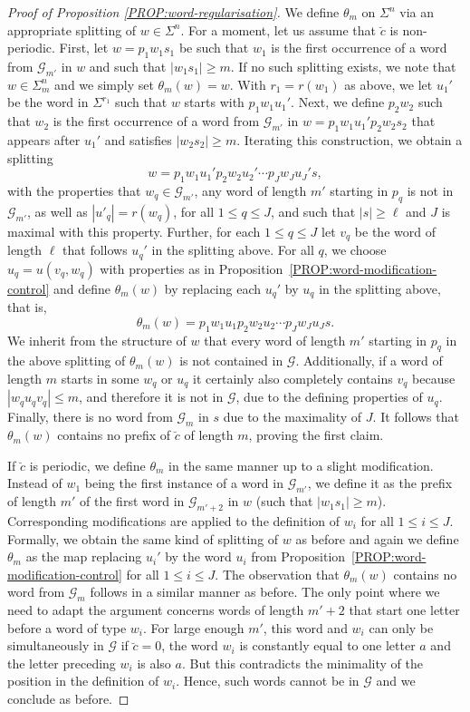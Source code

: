 \documentclass[11pt,reqno]{amsart}
\theoremstyle{plain}
\theoremstyle{definition}
\newcommand{\mc}{\mathcal}
\begin{document}
\begin{proof}[Proof of Proposition \ref{PROP:word-regularisation}]
We define $\theta_m$ on $\Sigma^n$ via an appropriate splitting of $w \in \Sigma^n$. 
For a moment, let us assume that $\breve{c}$ is non-periodic.
First, let $w = p_1 w_1 s_1$ be such that $w_1$ is the first occurrence of a word from $\mc G_{m'}$ in $w$ and such that $|w_1 s_1| \geqslant m$. If no such splitting exists, we note that $w \in \Sigma^n_m$ and we simply set $\theta_m(w) = w$. With $r_1 = r(w_1)$ as above, we let $u_1'$ be the word in $\Sigma^{r_1}$ such that $w$ starts with $p_1 w_1 u_1'$. Next, we define $p_2 w_2$ such that $w_2$ is the first occurrence of a word from $\mc G_{m'}$ in $w = p_1 w_1 u_1' p_2 w_2 s_2$ that appears after $u_1'$ and satisfies $|w_2 s_2| \geqslant m$. Iterating this construction, we obtain a splitting
\[
w = p_1 w_1 u_1' p_2 w_2 u_2' \cdots p_J w_J u_J' s,
\]
with the properties that $w_q \in \mc G_{m'}$, any word of length $m'$ starting in $p_q$ is not in $\mc G_{m'}$, as well as $|u'_q| = r(w_q)$, for all $1 \leqslant q \leqslant J$, and such that $|s| \geqslant \ell$ and $J$ is maximal with this property. Further, for each $1\leqslant q \leqslant J$ let $v_q$ be the word of length $\ell$ that follows $u_q'$ in the splitting above. 
For all $q$, we choose $u_q = u(v_q,w_q)$ with properties as in Proposition~\ref{PROP:word-modification-control} and define $\theta_m(w)$ by replacing each $u_q'$ by $u_q$ in the splitting above, that is,
\[
\theta_m(w) = p_1 w_1 u_1 p_2 w_2 u_2 \cdots p_J w_J u_J s.
\]
We inherit from the structure of $w$ that every word of length $m'$ starting in $p_q$ in the above splitting of $\theta_m(w)$ is not contained in $\mc G$. Additionally, if a word of length $m$ starts in some $w_q$ or $u_q$ it certainly also completely contains $v_q$ because $|w_q u_q v_q| \leqslant m$, and therefore it is not in $\mc G$, due to the defining properties of $u_q$. Finally, there is no word from $\mc G_m$ in $s$ due to the maximality of $J$. It follows that $\theta_m(w)$ contains no prefix of $\breve{c}$ of length $m$, proving the first claim.

If $\breve{c}$ is periodic, we define $\theta_m$ in the same manner up to a slight modification. Instead of $w_1$ being the first instance of a word in $\mc G_{m'}$, we define it as the prefix of length $m'$ of the first word in $\mc G_{m'+2}$ in $w$ (such that $|w_1 s_1| \geqslant m$). Corresponding modifications are applied to the definition of $w_i$ for all $1\leqslant i \leqslant J$. Formally, we obtain the same kind of splitting of $w$ as before and again we define $\theta_m$ as the map replacing $u_i'$ by the word $u_i$ from Proposition~\ref{PROP:word-modification-control} for all $1\leqslant i \leqslant J$. The observation that $\theta_m(w)$ contains no word from $\mc G_m$ follows in a similar manner as before. The only point where we need to adapt the argument concerns words of length $m'+2$ that start one letter before a word of type $w_i$. For large enough $m'$, this word and $w_i$ can only be simultaneously in $\mc G$ if $\breve{c} = 0$, the word $w_i$ is constantly equal to one letter $a$ and the letter preceding $w_i$ is also $a$. But this contradicts the minimality of the position in the definition of $w_i$. Hence, such words cannot be in $\mc G$ and we conclude as before.



\end{proof}
\end{document}
